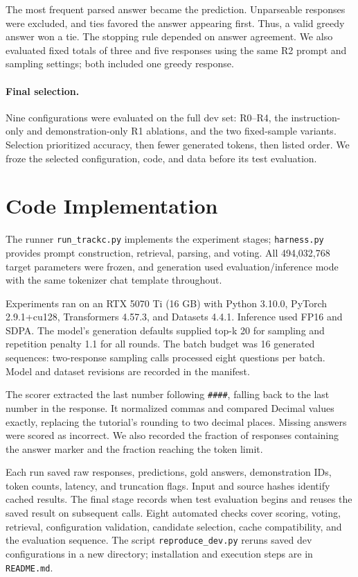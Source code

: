 \documentclass{article}
\begin{document}
The most frequent parsed answer became the prediction. Unparseable responses
were excluded, and ties favored the answer appearing first. Thus, a valid
greedy answer won a tie. The stopping rule depended on answer agreement.
We also evaluated fixed totals of three and five responses using the same
R2 prompt and sampling settings; both included one greedy response.

\paragraph{Final selection.}
Nine configurations were evaluated on the full dev set: R0--R4, the
instruction-only and demonstration-only R1 ablations, and the two fixed-sample
variants. Selection prioritized accuracy, then fewer generated tokens,
then listed order. We froze the selected configuration, code, and data
before its test evaluation.

\section{Code Implementation}
The runner \texttt{run\_trackc.py} implements the experiment stages;
\texttt{harness.py} provides prompt construction, retrieval, parsing, and voting.
All 494,032,768 target parameters were frozen, and generation used
evaluation/inference mode with the same tokenizer chat template throughout.

Experiments ran on an RTX 5070 Ti (16 GB) with Python 3.10.0,
PyTorch 2.9.1+cu128, Transformers 4.57.3, and Datasets 4.4.1.
Inference used FP16 and SDPA. The model's generation defaults supplied
top-k 20 for sampling and repetition penalty 1.1 for all rounds.
The batch budget was 16 generated sequences: two-response sampling calls
processed eight questions per batch. Model and dataset revisions are
recorded in the manifest.

The scorer extracted the last number following \texttt{\#\#\#\#}, falling
back to the last number in the response. It normalized commas and compared
Decimal values exactly, replacing the tutorial's rounding to two decimal
places. Missing answers were scored as incorrect. We also recorded the
fraction of responses containing the answer marker and the fraction reaching
the token limit.

Each run saved raw responses, predictions, gold answers, demonstration IDs,
token counts, latency, and truncation flags. Input and source hashes identify
cached results. The final stage records when test evaluation begins and
reuses the saved result on subsequent calls. Eight automated checks cover
scoring, voting, retrieval, configuration validation, candidate selection,
cache compatibility, and the evaluation sequence.
The script \texttt{reproduce\_dev.py} reruns saved dev configurations in a
new directory; installation and execution steps are in \texttt{README.md}.
\end{document}
